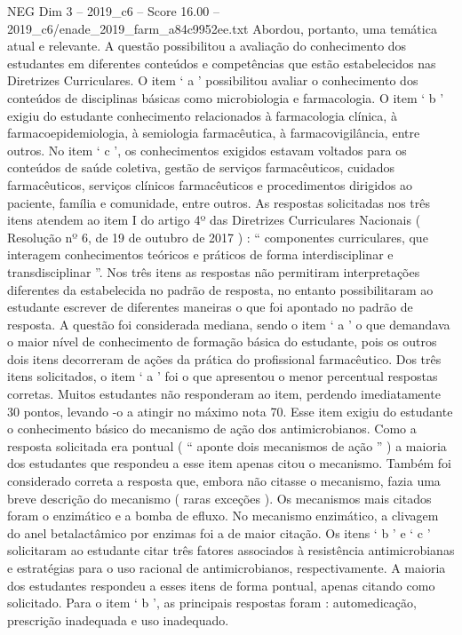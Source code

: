 \begin{textsample}{NEG Dim 3 – 2019\_c6 – Score 16.00 – 2019\_c6/enade\_2019\_farm\_a84c9952ee.txt}
Abordou, portanto, uma temática atual e relevante.
A questão possibilitou a avaliação do conhecimento dos estudantes em diferentes conteúdos e competências que estão estabelecidos nas Diretrizes Curriculares.
O item ‘ a ’ possibilitou avaliar o conhecimento dos conteúdos de disciplinas básicas como microbiologia e farmacologia.
O item ‘ b ’ exigiu do estudante conhecimento relacionados à farmacologia clínica, à farmacoepidemiologia, à semiologia farmacêutica, à farmacovigilância, entre outros.
No item ‘ c ’, os conhecimentos exigidos estavam voltados para os conteúdos de saúde coletiva, gestão de serviços farmacêuticos, cuidados farmacêuticos, serviços clínicos farmacêuticos e procedimentos dirigidos ao paciente, família e comunidade, entre outros.
As respostas solicitadas nos três itens atendem ao item I do artigo 4º das Diretrizes Curriculares Nacionais ( Resolução nº 6, de 19 de outubro de 2017 ) : “ componentes curriculares, que interagem conhecimentos teóricos e práticos de forma interdisciplinar e transdisciplinar ”.
Nos três itens as respostas não permitiram interpretações diferentes da estabelecida no padrão de resposta, no entanto possibilitaram ao estudante escrever de diferentes maneiras o que foi apontado no padrão de resposta.
A questão foi considerada mediana, sendo o item ‘ a ’ o que demandava o maior nível de conhecimento de formação básica do estudante, pois os outros dois itens decorreram de ações da prática do profissional farmacêutico.
Dos três itens solicitados, o item ‘ a ’ foi o que apresentou o menor percentual respostas corretas.
Muitos estudantes não responderam ao item, perdendo imediatamente 30 pontos, levando -o a atingir no máximo nota 70.
Esse item exigiu do estudante o conhecimento básico do mecanismo de ação dos antimicrobianos.
Como a resposta solicitada era pontual ( “ aponte dois mecanismos de ação ” ) a maioria dos estudantes que respondeu a esse item apenas citou o mecanismo.
Também foi considerado correta a resposta que, embora não citasse o mecanismo, fazia uma breve descrição do mecanismo ( raras exceções ).
Os mecanismos mais citados foram o enzimático e a bomba de efluxo.
No mecanismo enzimático, a clivagem do anel betalactâmico por enzimas foi a de maior citação.
Os itens ‘ b ’ e ‘ c ’ solicitaram ao estudante citar três fatores associados à resistência antimicrobianas e estratégias para o uso racional de antimicrobianos, respectivamente.
A maioria dos estudantes respondeu a esses itens de forma pontual, apenas citando como solicitado.
Para o item ‘ b ’, as principais respostas foram : automedicação, prescrição inadequada e uso inadequado.

\end{textsample}
